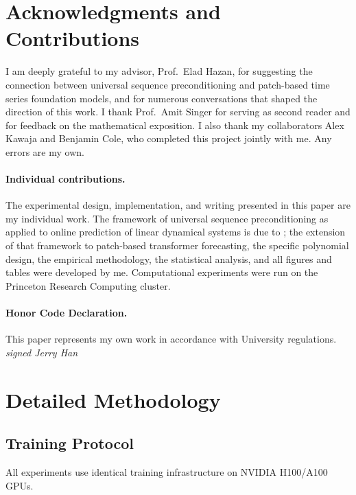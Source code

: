 \documentclass[11pt]{article}
\theoremstyle{plain}
\theoremstyle{definition}
\theoremstyle{remark}
\begin{document}
\section*{Acknowledgments and Contributions}

I am deeply grateful to my advisor, Prof.\ Elad Hazan, for suggesting the connection between universal sequence preconditioning and patch-based time series foundation models, and for numerous conversations that shaped the direction of this work. I thank Prof.\ Amit Singer for serving as second reader and for feedback on the mathematical exposition. I also thank my collaborators Alex Kawaja and Benjamin Cole, who completed this project jointly with me. Any errors are my own.

\paragraph{Individual contributions.}
The experimental design, implementation, and writing presented in this paper are my individual work. The framework of universal sequence preconditioning as applied to online prediction of linear dynamical systems is due to \citet{marsden2024universal}; the extension of that framework to patch-based transformer forecasting, the specific polynomial design, the empirical methodology, the statistical analysis, and all figures and tables were developed by me. Computational experiments were run on the Princeton Research Computing cluster.

\paragraph{Honor Code Declaration.}
This paper represents my own work in accordance with University regulations.\\[0.5em]
\textit{signed Jerry Han}

\newpage



\newpage
\appendix

\section{Detailed Methodology}
\label{app:methodology}

\subsection{Training Protocol}

All experiments use identical training infrastructure on NVIDIA H100/A100 GPUs.
\end{document}
